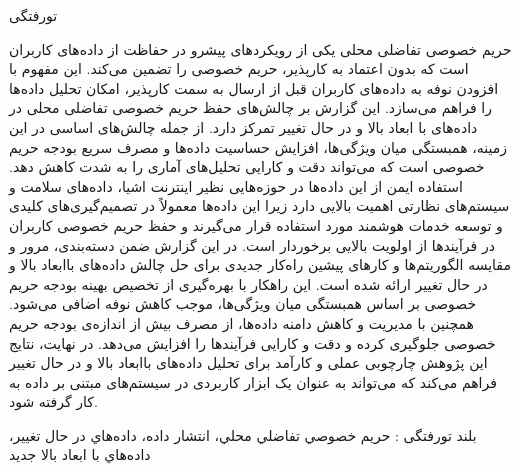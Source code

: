 


‌تورفتگی

حریم خصوصی تفاضلی محلی یکی از رویکردهای پیشرو در حفاظت از داده‌های کاربران است که بدون اعتماد به کارپذیر، حریم خصوصی را تضمین می‌کند. این مفهوم با افزودن نوفه به داده‌های کاربران قبل از ارسال به سمت کارپذیر، امکان تحلیل داده‌ها را فراهم می‌سازد. این گزارش بر چالش‌های حفظ حریم خصوصی تفاضلی محلی در داده‌های با ابعاد بالا و در حال تغییر تمرکز دارد. از جمله چالش‌های اساسی در این زمینه، همبستگی میان ویژگی‌ها، افزایش حساسیت داده‌ها و مصرف سریع بودجه حریم خصوصی است که می‌تواند دقت و کارایی تحلیل‌های آماری را به شدت کاهش دهد. استفاده ایمن از این داده‌ها در حوزه‌هایی نظیر اینترنت اشیا، داده‌های سلامت و سیستم‌های نظارتی اهمیت بالایی دارد زیرا این داده‌ها معمولاً در تصمیم‌گیری‌های کلیدی و توسعه خدمات هوشمند مورد استفاده قرار می‌گیرند و حفظ حریم خصوصی کاربران در فرآیندها از اولویت بالایی برخوردار است. در این گزارش ضمن دسته‌بندی، مرور و مقایسه الگوریتم‌ها و کارهای پیشین راه‌کار جدیدی برای حل چالش داده‌های با‌ابعاد بالا و در حال تغییر ارائه شده است. این راهکار با بهره‌گیری از تخصیص بهینه بودجه حریم خصوصی بر اساس همبستگی میان ویژگی‌ها، موجب کاهش نوفه اضافی می‌شود. همچنین با مدیریت و کاهش دامنه داده‌ها، از مصرف بیش از اندازه‌ی بودجه حریم خصوصی جلوگیری کرده و دقت و کارایی فرآیندها را افزایش می‌دهد. در نهایت، نتایج این پژوهش چارچوبی عملی و کارآمد برای تحلیل داده‌های با‌ابعاد بالا و در حال تغییر فراهم می‌کند که می‌تواند به عنوان یک ابزار کاربردی در سیستم‌های مبتنی بر داده به کار گرفته شود.

‌بلند
‌تورفتگی : 
ﺣﺮﻳﻢ ﺧﺼﻮﺻﻲ ﺗﻔﺎﺿﻠﻲ ﻣﺤﻠﻲ، ﺍﻧﺘﺸﺎﺭ ﺩﺍﺩﻩ، ﺩﺍﺩﻩﻫﺎﻱ ﺩﺭ ﺣﺎﻝ ﺗﻐﻴﻴﺮ، ﺩﺍﺩﻩﻫﺎﻱ ﺑﺎ ﺍﺑﻌﺎﺩ ﺑﺎﻻ
‌جدید
